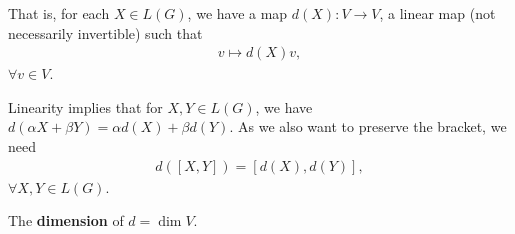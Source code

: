 That is, for each $X \in L \left( G \right) $, we have a map $d \left( X \right) : V \to V$, a linear map (not necessarily invertible) such that
\begin{align}
    v \mapsto d \left( X \right) v
,\end{align}
$\forall v \in V$.

Linearity implies that for $X,Y \in L \left( G \right) $, we have $d \left( \alpha X + \beta Y \right) = \alpha d \left( X \right) + \beta d\left( Y \right) $. As we also want to preserve the bracket, we need
\begin{align}
    d \left( \left[ X, Y \right]  \right) = \left[ d\left( X \right) , d\left( Y \right)  \right] 
,\end{align}
$\forall X,Y \in L \left( G \right) $.

\begin{definition}
    The \textbf{dimension} of $d = \dim V$.
\end{definition}

